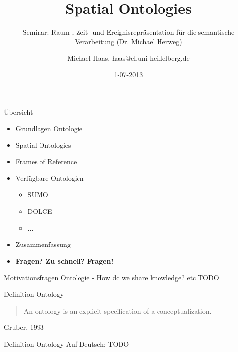 \documentclass[12pt,a4paper]{beamer}
\author{Michael Haas, haas@cl.uni-heidelberg.de}
\title{Spatial Ontologies}
\subtitle{Seminar: Raum-, Zeit- und Ereignisrepräsentation für die semantische Verarbeitung (Dr. Michael Herweg)}
\date{1-07-2013}
\begin{document}
\begin{frame}
\maketitle
\end{frame}

\begin{frame}{Übersicht}
\begin{itemize}
\item Grundlagen Ontologie
\item Spatial Ontologies
\item Frames of Reference
\item Verfügbare Ontologien
\begin{itemize}
    \item SUMO
    \item DOLCE
    \item ...
\end{itemize}
\item Zusammenfassung 
\item \textbf{Fragen? Zu schnell? Fragen!}
\end{itemize}
\end{frame}


\begin{frame}{Motivationsfragen Ontologie}
 - How do we share knowledge? etc TODO
\end{frame}





\begin{frame}{Definition Ontology}
\begin{quote}
An ontology is an explicit specification of a conceptualization.
\end{quote}
Gruber, 1993
\end{frame}

\begin{frame}{Definition Ontology}
Auf Deutsch: TODO
\end{frame}


\end{document}
